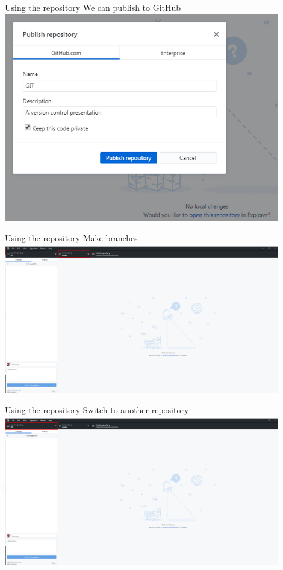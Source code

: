 \documentclass[10pt]{beamer}
\begin{document}
{\begin{frame}[fragile]{Using the repository}
\small We can publish to GitHub
\includegraphics[width=12cm]{Figs/GHD/init_00}
\end{frame}

\begin{frame}[fragile]{Using the repository}
\small Make branches
\includegraphics[width=12cm]{Figs/GHD/outline_04}
\end{frame}

\begin{frame}[fragile]{Using the repository}
\small Switch to another repository
\includegraphics[width=12cm]{Figs/GHD/outline_05}
\end{frame}

}
\end{document}
